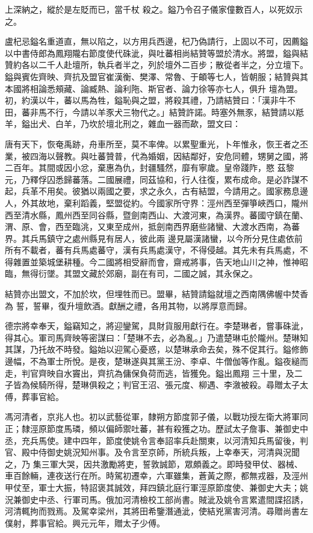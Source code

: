 \begin{pinyinscope}
 上深納之，縱於是左貶而已，當千杖
 殺之。鎰乃令召子儀家僮數百人，以死奴示之。



 盧杞忌鎰名重道直，無以陷之，以方用兵西邊，杞乃偽請行，上固以不可，因薦鎰以中書侍郎為鳳翔隴右節度使代硃泚，與吐蕃相尚結贊等盟於清水。將盟，鎰與結贊約各以二千人赴壇所，執兵者半之，列於壇外二百步；散從者半之，分立壇下。鎰與賓佐齊映、齊抗及盟官崔漢衡、樊澤、常魯、于頔等七人，皆朝服；結贊與其本國將相論悉頰藏、論臧熱、論利陁、斯官者、論力徐等亦七人，俱升
 壇為盟。初，約漢以牛，蕃以馬為牲，鎰恥與之盟，將殺其禮，乃請結贊曰：「漢非牛不田，蕃非馬不行，今請以羊豕犬三物代之。」結贊許諾。時塞外無豕，結贊請以羝羊，鎰出犬、白羊，乃坎於壇北刑之，雜血一器而歃，盟文曰：



 唐有天下，恢奄禹跡，舟車所至，莫不率俾。以累聖重光，卜年惟永，恢王者之丕業，被四海以聲教。與吐蕃贊普，代為婚姻，因結鄰好，安危同體，甥舅之國，將二百年。其間或因小忿，棄惠為仇，封疆騷然，靡有寧歲。皇帝踐阼，愍
 茲黎元，乃釋俘囚悉歸蕃落。二國展禮，同茲協和，行人往復，累布成命。是必詐謀不起，兵革不用矣。彼猶以兩國之要，求之永久，古有結盟，今請用之。國家務息邊人，外其故地，棄利蹈義，堅盟從約。今國家所守界：涇州西至彈箏峽西口，隴州西至清水縣，鳳州西至同谷縣，暨劍南西山、大渡河東，為漢界。蕃國守鎮在蘭、渭、原、會，西至臨洮，又東至成州，抵劍南西界磨些諸蠻、大渡水西南，為蕃界。其兵馬鎮守之處州縣見有居人，彼此兩
 邊見屬漢諸蠻，以今所分見住處依前所有不載者，蕃有兵馬處蕃守，漢有兵馬處漢守，不得侵越。其先未有兵馬處，不得雜置並築城堡耕種。今二國將相受辭而會，齋戒將事，告天地山川之神，惟神昭臨，無得衍墜。其盟文藏於郊廟，副在有司，二國之誠，其永保之。



 結贊亦出盟文，不加於坎，但埋牲而已。盟畢，結贊請鎰就壇之西南隅佛幄中焚香為
 誓，誓畢，復升壇飲酒。獻酬之禮，各用其物，以將厚意而歸。



 德宗將幸奉天，鎰竊知之，將迎鑾駕，具財貨服用獻行在。李楚琳者，嘗事硃泚，得其心。軍司馬齊映等密謀曰：「楚琳不去，必為亂。」乃遣楚琳屯於隴州。楚琳知其謀，乃托故不時發。鎰始以迎駕心憂惑，以楚琳承命去矣，殊不促其行。鎰修飾邊幅，不為軍士所悅。是夜，楚琳遂與其黨王汾、李卓、牛僧伽等作亂。鎰夜縋而走，判官齊映自水竇出，齊抗為傭保負荷而逃，皆獲免。鎰出鳳翔
 三十里，及二子皆為候騎所得，楚琳俱殺之；判官王沼、張元度、柳遇、李漵被殺。尋贈太子太傅，葬事官給。



 馮河清者，京兆人也。初以武藝從軍，隸朔方節度郭子儀，以戰功授左衛大將軍同正；隸涇原節度馬璘，頻以偏師禦吐蕃，甚有殺獲之功。歷試太子詹事、兼御史中丞，充兵馬使。建中四年，節度使姚令言奉詔率兵赴關東，以河清知兵馬留後，判官、殿中侍御史姚況知州事。及令言至京師，所統兵叛，上幸奉天，河清與況聞之，乃
 集三軍大哭，因共激勵將吏，誓敦誠節，眾頗義之。即時發甲仗、器械、車百餘輛，連夜送行在所。時駕初遷幸，六軍雖集，蒼黃之際，都無戎器，及涇州甲仗至，軍士大振，特詔褒其誠效，拜四鎮北庭行軍涇原節度使、兼御史大夫；姚況兼御史中丞、行軍司馬。俄加河清檢校工部尚書。賊泚及姚令言累遣間諜招誘，河清輒拘而戮焉。及駕幸梁州，其將田希鑒潛通泚，使結兇黨害河清。尋贈尚書左僕射，葬事官給。興元元年，贈太子少傅。




\end{pinyinscope}
